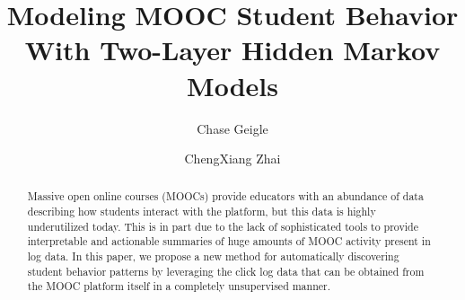 \documentclass[final]{sigchi-modern}
\begin{document}
\title{Modeling MOOC Student Behavior With Two-Layer Hidden Markov Models}

\author[1]{Chase Geigle}
\author[1]{ChengXiang Zhai}

\settowidth{\authorwidth}{ChengXiang Zhai1}
\settowidth{\affilwidth}{University of Illinois at Urbana-ChampaignAAA}




\maketitle

\begin{abstract}
  Massive open online courses (MOOCs) provide educators with an abundance
  of data describing how students interact with the platform, but this data
  is highly underutilized today. This is in part due to the lack of
  sophisticated tools to provide interpretable and actionable summaries of
  huge amounts of MOOC activity present in log data. In this paper, we
  propose a new method for automatically discovering student behavior
  patterns by leveraging the click log data that can be obtained from the
  MOOC platform itself in a completely unsupervised manner.
\end{abstract}
\end{document}
